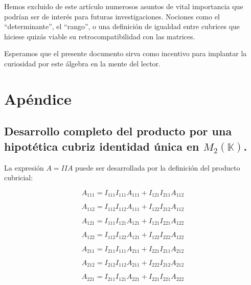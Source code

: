 \documentclass[a4paper, titlepage]{article}
\begin{document}
Hemos excluido de este artículo numerosos asuntos de vital importancia que podrían ser de interés para futuras investigaciones. Nociones como el ``determinante'', el ``rango'', o una definición de igualdad entre cubrices que hiciese quizás viable su retrocompatibilidad con las matrices.

Esperamos que el presente documento sirva como incentivo para implantar la curiosidad por este álgebra en la mente del lector.

\newpage
\appendix

\section{Apéndice}

\subsection{Desarrollo completo del producto por una hipotética cubriz identidad única en $M_2 (\mathbb{K})$.}

La expresión $A = IIA$ puede ser desarrollada por la definición del producto cubricial:

\begin{equation}
A_{111} = I_{111} I_{111} A_{111} + I_{121} I_{211} A_{112}
\end{equation}

\begin{equation}
A_{112} = I_{112} I_{112} A_{111} + I_{122} I_{212} A_{112}
\end{equation}

\begin{equation}
A_{121} = I_{111} I_{121} A_{121} + I_{121} I_{221} A_{122}
\end{equation}

\begin{equation}
A_{122} = I_{112} I_{122} A_{121} + I_{122} I_{222} A_{122}
\end{equation}

\begin{equation}
A_{211} = I_{211} I_{111} A_{211} + I_{221} I_{211} A_{212}
\end{equation}

\begin{equation}
A_{212} = I_{212} I_{112} A_{211} + I_{222} I_{212} A_{212}
\end{equation}

\begin{equation}
A_{221} = I_{211} I_{121} A_{221} + I_{221} I_{221} A_{222}
\end{equation}
\end{document}
